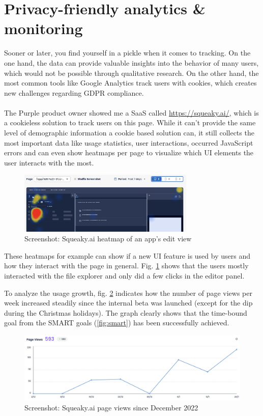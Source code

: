 \section{Privacy-friendly analytics \& monitoring}
\label{sec:analytics}

Sooner or later, you find yourself in a pickle when it comes to tracking.
On the one hand, the data can provide valuable insights into the behavior of many users, which would not be possible through qualitative research.
On the other hand, the most common tools like Google Analytics track users with cookies, which creates new challenges regarding GDPR compliance.
\\\\
The Purple product owner showed me a SaaS called \url{https://squeaky.ai/}, which is a cookieless solution to track users on this page.
While it can't provide the same level of demographic information a cookie based solution can, it still collects the most important data like usage statistics,
user interactions, occurred JavaScript errors and can even show heatmaps per page to visualize which UI elements the user interacts with the most.

\begin{figure}[h]
  \centering
  \includegraphics[width=0.75\textwidth]{pics/squeaky_heatmap.jpg}
  \caption{Screenshot: Squeaky.ai heatmap of an app's edit view}
  \label{fig:squeaky}
\end{figure}

These heatmaps for example can show if a new UI feature is used by users and how they interact with the page in general.
Fig. \ref{fig:squeaky} shows that the users mostly interacted with the file explorer and only did a few clicks in the editor panel.

To analyze the usage growth, fig. \ref{fig:squeaky_users} indicates how the number of page views per week increased steadily since the internal beta was launched (except for the dip during the Christmas holidays).
The graph clearly shows that the time-bound goal from the SMART goals (\ref{fig:smart}) has been successfully achieved.

\begin{figure}[h]
  \centering
  \includegraphics[width=\textwidth]{pics/squeaky_user_curve.jpg}
  \caption{Screenshot: Squeaky.ai page views since December 2022}
  \label{fig:squeaky_users}
\end{figure}

